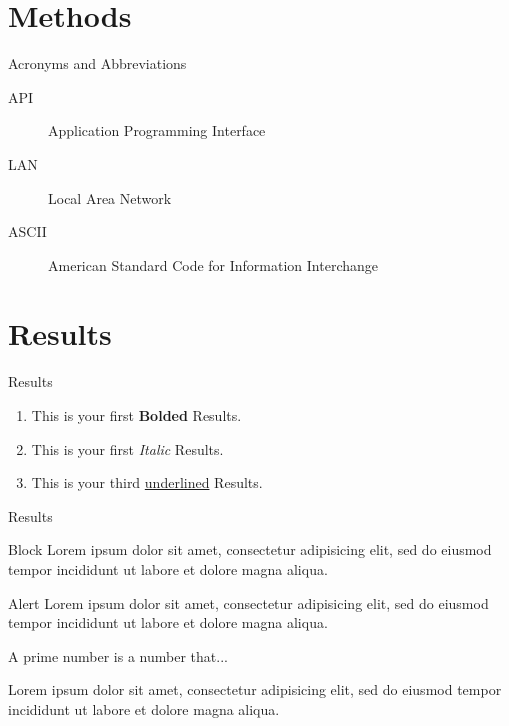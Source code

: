 \documentclass[10pt]{beamer}
\begin{document}
\section{Methods}
    \begin{frame}{Acronyms and Abbreviations}
     \begin{description}
        \item[API] Application Programming Interface
        \item[LAN] Local Area Network
        \item[ASCII] American Standard Code for Information Interchange
    \end{description}
    \end{frame}


\section{Results}
\begin{frame}{Results}
	\begin{enumerate}
	    \item This is your first \textbf{Bolded} Results.  
         \item This is your first \textit{Italic} Results.  
         \item This is your third \underline{underlined} Results.
        
	\end{enumerate}
\end{frame}
\begin{frame}{Results}

\begin{block}{Block }
Lorem ipsum dolor sit amet, consectetur adipisicing elit, 
sed do eiusmod tempor incididunt ut labore et 
dolore magna aliqua.
\end{block}

\begin{alertblock}{Alert}
Lorem ipsum dolor sit amet, consectetur adipisicing elit, 
sed do eiusmod tempor incididunt ut labore et 
dolore magna aliqua.
\end{alertblock}

\begin{definition}
A prime number is a number that...
\end{definition}

\begin{example}
Lorem ipsum dolor sit amet, consectetur adipisicing elit, 
sed do eiusmod tempor incididunt ut labore et
dolore magna aliqua.
\end{example}

\end{frame}
\end{document}
